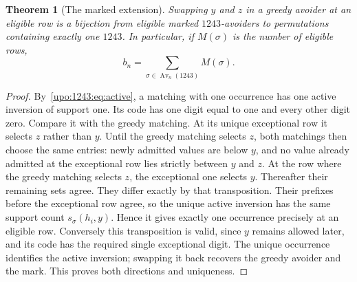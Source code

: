 \documentclass[11pt,letterpaper]{article}
\newtheorem{theorem}{Theorem}[section]
\theoremstyle{remark}\newtheorem{remark}[theorem]{Remark}
\numberwithin{equation}{section}
\newcommand{\Av}{\operatorname{Av}}
\begin{document}
\begin{theorem}[The marked extension]\label{upo:1243:thm:marked}
Swapping $y$ and $z$ in a greedy avoider at an eligible row is a bijection
from eligible marked $1243$-avoiders to permutations containing exactly
one $1243$. In particular, if $M(\sigma)$ is the number of eligible rows,
\begin{equation}\label{upo:1243:eq:marked}
 b_n=\sum_{\sigma\in\Av_n(1243)}M(\sigma).
\end{equation}
\end{theorem}
\begin{proof}
By~\eqref{upo:1243:eq:active}, a matching with one occurrence has one active
inversion of support one. Its code has one digit equal to one and every
other digit zero. Compare it with the greedy matching. At its unique
exceptional row it selects $z$ rather than $y$. Until the greedy matching
selects $z$, both matchings then choose the same entries: newly admitted
values are below $y$, and no value already admitted at the exceptional
row lies strictly between $y$ and $z$. At the row where the greedy
matching selects $z$, the exceptional one selects $y$. Thereafter their
remaining sets agree. They differ exactly by that transposition.
Their prefixes before the exceptional row agree, so the unique active
inversion has the same support count $s_\sigma(h_i,y)$. Hence it gives
exactly one occurrence precisely at an eligible row. Conversely this
transposition is valid, since $y$ remains allowed later, and its code
has the required single exceptional digit. The unique occurrence
identifies the active inversion; swapping it back recovers the greedy
avoider and the mark. This proves both directions and uniqueness.
\end{proof}
\end{document}
